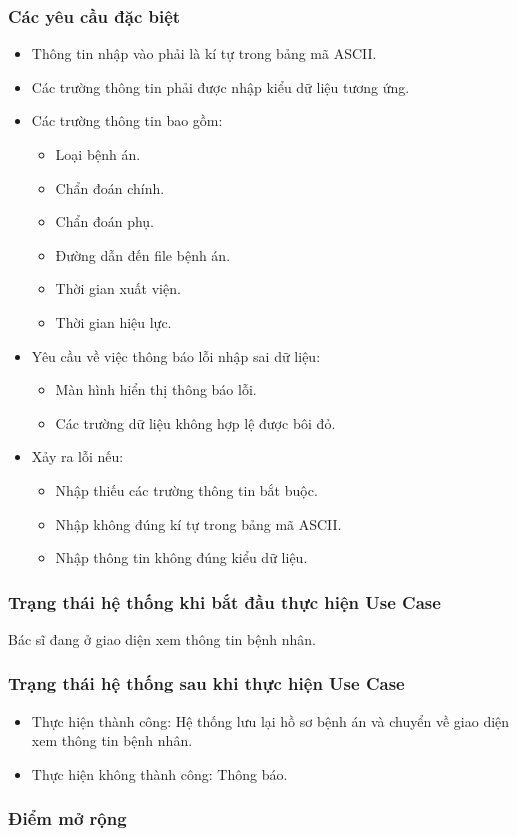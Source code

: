 \subsubsection{Các yêu cầu đặc biệt}
\begin{itemize}
  \item Thông tin nhập vào phải là kí tự trong bảng mã ASCII.
  \item Các trường thông tin phải được nhập kiểu dữ liệu tương ứng.
  \item Các trường thông tin bao gồm:
    \begin{itemize}
      \item Loại bệnh án.
      \item Chẩn đoán chính.
      \item Chẩn đoán phụ.
      \item Đường dẫn đến file bệnh án.
      \item Thời gian xuất viện.
      \item Thời gian hiệu lực.
    \end{itemize}
  \item Yêu cầu về việc thông báo lỗi nhập sai dữ liệu:
    \begin{itemize}
      \item Màn hình hiển thị thông báo lỗi.
      \item Các trường dữ liệu không hợp lệ được bôi đỏ.
    \end{itemize}
  \item Xảy ra lỗi nếu:
    \begin{itemize}
      \item Nhập thiếu các trường thông tin bắt buộc.
      \item Nhập không đúng kí tự trong bảng mã ASCII.
      \item Nhập thông tin không đúng kiểu dữ liệu.
    \end{itemize}
\end{itemize}

\subsubsection{Trạng thái hệ thống khi bắt đầu thực hiện Use Case}
Bác sĩ đang ở giao diện xem thông tin bệnh nhân.

\subsubsection{Trạng thái hệ thống sau khi thực hiện Use Case}
\begin{itemize}
  \item Thực hiện thành công: Hệ thống lưu lại hồ sơ bệnh án và chuyển về giao diện xem thông tin bệnh nhân.
  \item Thực hiện không thành công: Thông báo.
\end{itemize}

\subsubsection{Điểm mở rộng}